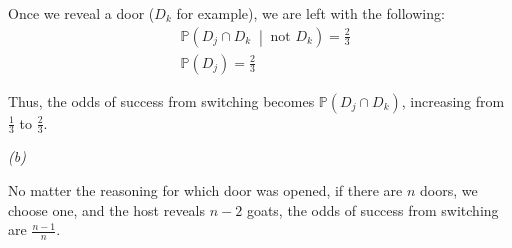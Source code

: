 \documentclass[titlepage, 12pt, leqno]{article}
\begin{document}
Once we reveal a door ($D_k$ for example), we are left with the following:
\begin{align*}
    &\mathbb{P}\left(D_j \cap D_k \;\middle|\; \text{not }D_k\right) = \frac{2}{3} \\ 
    &\mathbb{P}(D_j) = \frac{2}{3} 
\end{align*}

Thus, the odds of success from switching becomes $\mathbb{P}(D_j \cap D_k)$, increasing from $\frac{1}{3}$ to $\frac{2}{3}$.

\textit{(b)}

No matter the reasoning for which door was opened, if there are $n$ doors, we choose one, and the host reveals $n-2$ goats, the odds of success from switching are $\frac{n-1}{n}$. 
\end{document}
